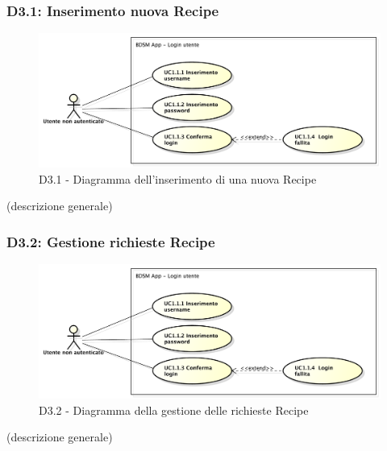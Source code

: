 

		\subsubsection{D3.1: Inserimento nuova Recipe} %
		\label{ssub:inserimento_nuova_recipe}
		\begin{figure}[!htbp]
			\centering
			\centerline{\includegraphics[scale=0.45]{./images/UC1_1.pdf}}
			\caption{D3.1 - Diagramma dell'inserimento di una nuova Recipe}
		\end{figure}
		\noindent
		[TO DO] (descrizione generale)


		\subsubsection{D3.2: Gestione richieste Recipe} %
		\label{ssub:gestione_richieste_recipe}
		\begin{figure}[!htbp]
			\centering
			\centerline{\includegraphics[scale=0.45]{./images/UC1_1.pdf}}
			\caption{D3.2 - Diagramma della gestione delle richieste Recipe}
		\end{figure}
		\noindent
		[TO DO] (descrizione generale)


